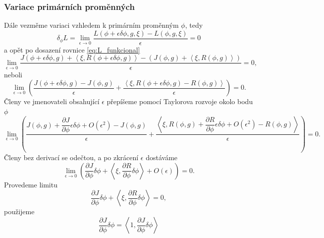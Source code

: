 \subsubsection{Variace primárních proměnných}
Dále vezměme variaci vzhledem k primárním proměnným $ \phi $, tedy
\begin{equation}
\delta_\phi L =
\lim\limits_{\epsilon\rightarrow0}
\dfrac{L(\phi+\epsilon\delta\phi,g,\xi)-L(\phi,g,\xi)}
{\epsilon}
=0
\end{equation}
a opět po dosazení rovnice \ref{eq:L_funkcional}
\begin{equation}
\lim\limits_{\epsilon\rightarrow0} \dfrac
{J(\phi+\epsilon\delta\phi, g) + 
 \left\langle\xi , R(\phi+\epsilon\delta\phi, g) \right\rangle -  (J(\phi, g) +  \left\langle\xi , R(\phi, g)\right\rangle)}
{\epsilon}
=0,
\end{equation}
neboli
\begin{equation}
\lim\limits_{\epsilon\rightarrow 0} 
\left(
\dfrac
{J(\phi+\epsilon\delta\phi, g) - J(\phi, g)}
{\epsilon}
+
\dfrac
{  \left\langle\xi , R(\phi+\epsilon\delta\phi,g) - R(\phi, g)\right\rangle }
{\epsilon}
\right)
=0.
\end{equation}
Členy ve jmenovateli obsahující $ \epsilon $ přepíšeme pomocí Taylorova rozvoje okolo bodu $ \phi $
\begin{equation}
\lim\limits_{\epsilon\rightarrow 0} 
\left(
\dfrac
{J(\phi, g) + \dfrac{\partial J}{\partial \phi}\epsilon\delta\phi + O(\epsilon^2) - J(\phi, g)}
{\epsilon}
+
\dfrac
{  \left\langle\xi , R(\phi,g) + \dfrac{\partial R}{\partial \phi} \epsilon \delta\phi + O(\epsilon^2) - R(\phi,g)\right\rangle }
{\epsilon}
\right)
=0.
\end{equation}
Členy bez derivací se odečtou, a po zkrácení $\epsilon$ dostáváme
\begin{equation}
\lim\limits_{\epsilon\rightarrow 0} 
\left(
\dfrac{\partial J}{\partial \phi}\delta\phi
+  \left\langle\xi , \dfrac{\partial R}{\partial \phi} \delta\phi \right\rangle
+O(\epsilon)
\right)
=0.
\end{equation}
Provedeme limitu 
\begin{equation}\label{eq:sdruzene_rce_variace}
\frac{\partial J}{\partial \phi}\delta\phi
+  \left\langle\xi , \dfrac{\partial R}{\partial \phi} \delta\phi\right\rangle
=0,
\end{equation}
použijeme 
\begin{equation}
\frac{\partial J}{\partial \phi}\delta\phi = \left\langle 1, \frac{\partial J}{\partial \phi}\delta\phi \right\rangle
\end{equation}
